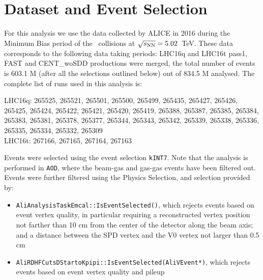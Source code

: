
\section{Dataset and Event Selection}

For this analysis we use the data collected by ALICE in 2016 during the Minimum Bias period of the \pPb\ collisions at $\sqrt{s_{\rm NN}}=5.02$~TeV. These data corresponds to the following data taking periods:
LHC16q and LHC16t pass1, FAST and CENT\_woSDD productions were merged, the total number of events is 603.1 M (after all the selections outlined below) out of 834.5 M analysed.
The complete list of runs used in this analysis is:

LHC16q: 265525, 265521, 265501, 265500, 265499, 265435, 265427, 265426, 265425, 265424, 265422, 265421, 265420, 265419, 265388, 265387, 265385, 265384, 265383, 265381, 265378, 265377, 265344, 265343, 265342, 265339, 265338, 265336, 265335, 265334, 265332, 265309  \\
LHC16t: 267166, 267165, 267164, 267163 

Events were selected using the event selection \texttt{kINT7}. Note that the analysis is performed in \texttt{AOD}, where the beam-gas and gas-gas events have been filtered out.
Events were further filtered using the Physics Selection, and selection provided by:
\begin{itemize}
\item \texttt{AliAnalysisTaskEmcal::IsEventSelected()}, which rejects events based on event vertex quality, in particular requiring a reconstructed vertex position not farther than 10 cm from the center of the detector along the beam axis; and a distance between the SPD vertex and the V0 vertex not larger than 0.5 cm %
\item \texttt{AliRDHFCutsDStartoKpipi::IsEventSelected(AliVEvent*)}, which rejects events based on event vertex quality 
and pileup 
\end{itemize}

